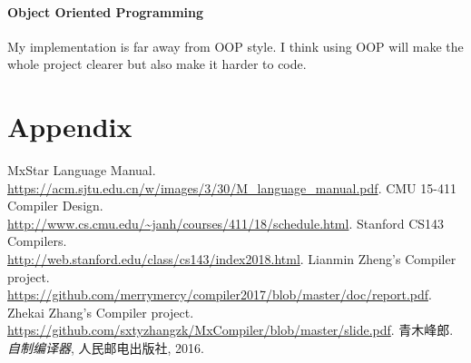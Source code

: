 \documentclass[12pt, a4paper]{article}
\begin{document}
\paragraph{Object Oriented Programming}
My implementation is far away from OOP style. I think using OOP will make the whole project clearer but also make it harder to code.

\section{Appendix}

\begin{thebibliography}{9}
	MxStar Language Manual.
	\\\url{https://acm.sjtu.edu.cn/w/images/3/30/M_language_manual.pdf}.
  	CMU 15-411 Compiler Design.
	\\\url{http://www.cs.cmu.edu/~janh/courses/411/18/schedule.html}.
	Stanford CS143 Compilers.
	\\\url{http://web.stanford.edu/class/cs143/index2018.html}.
	Lianmin Zheng's Compiler project.
	\\\url{https://github.com/merrymercy/compiler2017/blob/master/doc/report.pdf}.
	Zhekai Zhang's Compiler project.
	\\\url{https://github.com/sxtyzhangzk/MxCompiler/blob/master/slide.pdf}.
  	青木峰郎. 
  	\emph{自制编译器},
  	人民邮电出版社, 2016.
  \end{thebibliography}
\end{document}
